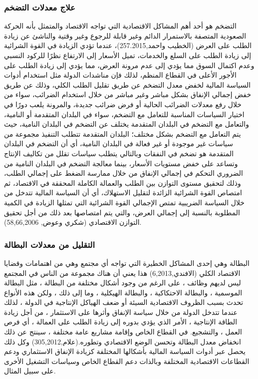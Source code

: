 \documentclass[10pt,a4paper]{report}
\begin{document}
\begin{doublespacing}
\subsubsection{علاج معدلات التضخم}
\sloppy
التضخم هو أحد أهم المشاكل الاقتصادية التي تواجه الاقتصاد والمتمثل بأنه الحركة الصعودية المتصفة بالاستمرار الدائم وغير قابلة للرجوع وغير وقتية والناشئ عن زيادة الطلب على العرض (الخطيب واحمد,257.2015)، عندما تؤدي الزيادة في القوة الشرائية إلى زيادة الطلب على السلع والخدمات، تميل الأسعار إلى الارتفاع نظرًا للركود النسبي وعدم اكتمال السوق مما يؤدي إلى عدم مرونة العرض، مما يؤدي إلى زيادة الطلب على الأجور الأعلى في القطاع المنظم، لذلك فإن مناشدات الدولة مثل استخدام أدوات السياسة المالية لخفض معدل التضخم عن طريق تقليل الطلب الكلي، وذلك عن طريق خفض إجمالي الإنفاق بشكل مباشر وغير مباشر من خلال استخدام الضرائب، سواء من خلال رفع معدلات الضرائب الحالية أو فرض ضرائب جديدة، والمرونة يلعب دورًا في اختيار السياسات المناسبة للتعامل مع التضخم، سواء في البلدان المتقدمة أو النامية، والتعامل مع التضخم في البلدان المتقدمة يختلف عن التضخم في البلدان النامية، حيث يتم التعامل مع التضخم بشكل مختلف؛ البلدان المتقدمة تتطلب التنفيذ مجموعة من سياسات غير موجودة أو غير فعالة في البلدان النامية، أي أن التضخم في البلدان المتقدمة هو تضخم في النفقات وبالتالي يتطلب سياسات تقلل من تكاليف الإنتاج وتساعد على خفض مستويات الأسعار، بينما معالجة التضخم في البلدان النامية من الضروري التحكم في إجمالي الإنفاق من خلال ممارسة الضغط على إجمالي الطلب، وذلك لتحقيق مستوى التوازن بين الطلب والعمالة الكاملة المحققة في الاقتصاد، ثم امتصاص القوة الشرائية الزائدة لتقليل الاستهلاك، أي أن السياسة المالية تتدخل من خلال السياسة الضريبية تمتص الإجمالي القوة الشرائية التي تمثلها الزيادة في الكمية المطلوبة بالنسبة إلى إجمالي العرض، والتي يتم امتصاصها بعد ذلك من أجل تحقيق التوازن الاقتصادي {(شكري وعوض, 58,66,2006)}.
\subsubsection{التقليل من معدلات البطالة}
البطالة وهي إحدى المشاكل الخطيرة التي تواجه أي مجتمع وهي من اهتمامات وقضايا الاقتصاد الكلي (الافندي,6,2013) هذا يعني أن هناك مجموعة من الناس في المجتمع ليس لديهم وظائف ، على الرغم من وجود أشكال مختلفة من البطالة ، مثل البطالة الموسمية ، والبطالة الاحتكاكية ، والبطالة الهيكلية ، وما إلى ذلك ، ولكن هذه الأنواع تحدث بسبب الظروف الاقتصادية السيئة أو ضعف الهياكل الإنتاجية في الدولة ، لذلك عندما تتدخل الدولة من خلال سياسة الإنفاق وأثرها على الاستثمار ، من أجل زيادة الطاقة الإنتاجية ، الأمر الذي يؤدي بدوره إلى زيادة الطلب على العمالة ، أي فرص العمل ، والتشجيع. في القطاع الخاص وإقامة مشاريع عامة مختلفة ، سينتج عن ذلك انخفاض معدل البطالة وتحسن الوضع الاقتصادي وتطوره.(علام,305,2012) وكل ذلك يحصل عبر أدوات السياسة المالية بأشكالها المختلفة كزيادة الإنفاق الاستثماري ودعم القطاعات الاقتصادية المختلفة وبالذات دعم القطاع الخاص وسياسات التشغيل الأخرى على سبيل المثال.

\end{doublespacing}
\end{document}
